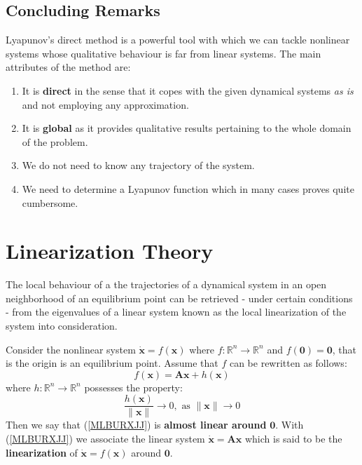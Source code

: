 \documentclass[a4paper,10pt,oneside]{book}
\begin{document}
\subsection{Concluding Remarks}
Lyapunov's direct method is a powerful tool with which we can tackle nonlinear systems whose
qualitative behaviour is far from linear systems. The main attributes of the method are:
\begin{enumerate}
 \item It is \textbf{direct} in the sense that it copes with the given dynamical systems \emph{as is}
       and not employing any approximation.
 \item It is \textbf{global} as it provides qualitative results pertaining to the whole domain of the problem.
 \item We do not need to know any trajectory of the system.
 \item We need to determine a Lyapunov function which in many cases proves quite cumbersome.
\end{enumerate}

\section{Linearization Theory}
The local behaviour of a the trajectories of a dynamical system in an open neighborhood
of an equilibrium point can be retrieved - under certain conditions - from the eigenvalues
of a linear system known as the local linearization of the system into consideration.

Consider the nonlinear system $\dot{\mathbf{x}}=f(\mathbf{x})$ where $f:\mathbb{R}^n\to\mathbb{R}^n$ and
$f(\mathbf{0})=\mathbf{0}$, that is the origin is an equilibrium point. Assume that $f$ can be rewritten
as follows:
\begin{equation}\label{MLBURXJJ}
 f(\mathbf{x})=\mathbf{Ax}+h(\mathbf{x})
\end{equation}
where $h:\mathbb{R}^n\to\mathbb{R}^n$ possesses the property:
\begin{equation}
 \frac{h(\mathbf{x})}{\|\mathbf{x}\|}\to 0, \text{ as } \|\mathbf{x}\|\to 0
\end{equation}
Then we say that (\ref{MLBURXJJ}) is \textbf{almost linear around} $\mathbf{0}$.
With (\ref{MLBURXJJ}) we associate the linear system $\dot{\mathbf{x}}=\mathbf{Ax}$
which is said to be the \textbf{linearization} of $\dot{\mathbf{x}}=f(\mathbf{x})$
around $\mathbf{0}$.
\end{document}

